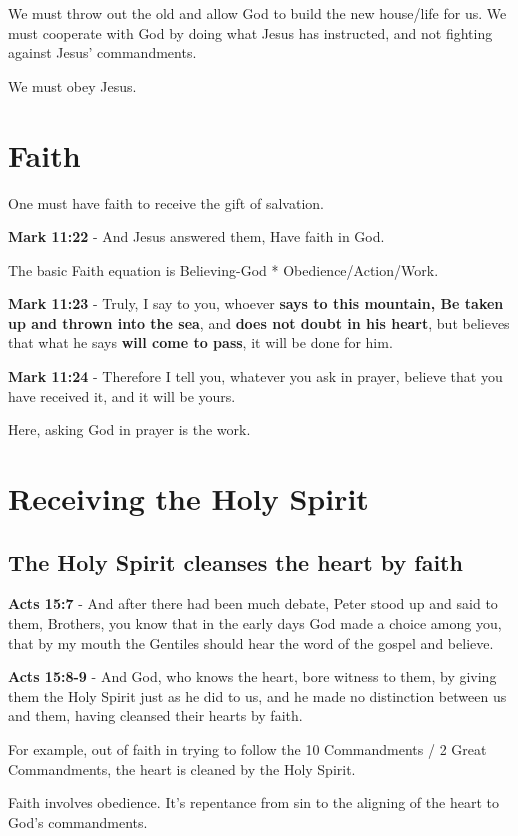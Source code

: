 \documentclass[11pt]{article}
\begin{document}
We must throw out the old and allow God to build the new house/life for us.
We must cooperate with God by doing what Jesus has instructed, and not fighting against Jesus' commandments.

We must obey Jesus.

\section{Faith}
\label{sec:org4b822e2}
One must have faith to receive the gift of salvation.

\textbf{Mark 11:22} - And Jesus answered them, Have faith in God.

The basic Faith equation is Believing-God * Obedience/Action/Work.

\textbf{Mark 11:23} - Truly, I say to you, whoever \textbf{says to this mountain, Be taken up and thrown into the sea}, and \textbf{does not doubt in his heart}, but believes that what he says \textbf{will come to pass}, it will be done for him.

\textbf{Mark 11:24} - Therefore I tell you, whatever you ask in prayer, believe that you have received it, and it will be yours.

Here, asking God in prayer is the work.

\section{Receiving the Holy Spirit}
\label{sec:org38028de}
\subsection{The Holy Spirit cleanses the heart by faith}
\label{sec:orgf9f0c80}
\textbf{Acts 15:7} - And after there had been much debate, Peter stood up and said to them, Brothers, you know that in the early days God made a choice among you, that by my mouth the Gentiles should hear the word of the gospel and believe.

\textbf{Acts 15:8-9} - And God, who knows the heart, bore witness to them, by giving them the Holy Spirit just as he did to us, and he made no distinction between us and them, having cleansed their hearts by faith.

For example, out of faith in trying to follow the 10 Commandments / 2 Great Commandments, the heart is cleaned by the Holy Spirit.

Faith involves obedience. It's repentance from sin to the aligning of the heart to God's commandments.
\end{document}
